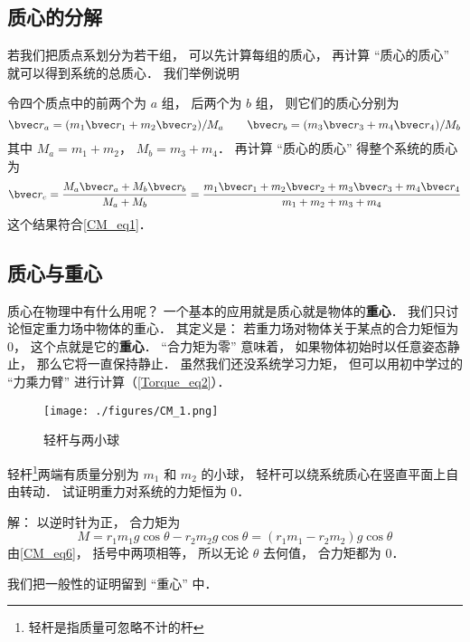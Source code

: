 \subsection{质心的分解}
若我们把质点系划分为若干组， 可以先计算每组的质心， 再计算 “质心的质心” 就可以得到系统的总质心． 我们举例说明
\begin{example}{}
令四个质点中的前两个为 $a$ 组， 后两个为 $b$ 组， 则它们的质心分别为
\begin{equation}
\bvec r_a = (m_1 \bvec r_1 + m_2 \bvec r_2)/M_a
\qquad
\bvec r_b = (m_3 \bvec r_3 + m_4 \bvec r_4)/M_b
\end{equation}
其中 $M_a = m_1 + m_2$， $M_b = m_3 + m_4$． 再计算 “质心的质心” 得整个系统的质心为
\begin{equation}
\bvec r_c = \frac{M_a \bvec r_a + M_b \bvec r_b}{M_a + M_b} = \frac{m_1 \bvec r_1 + m_2 \bvec r_2 + m_3 \bvec r_3 + m_4 \bvec r_4}{m_1 + m_2 + m_3 + m_4}
\end{equation}
这个结果符合\autoref{CM_eq1}．
\end{example}

\subsection{质心与重心}
质心在物理中有什么用呢？ 一个基本的应用就是质心就是物体的\textbf{重心}． 我们只讨论恒定重力场中物体的重心． 其定义是： 若重力场对物体关于某点的合力矩恒为 0， 这个点就是它的\textbf{重心}． “合力矩为零” 意味着， 如果物体初始时以任意姿态静止， 那么它将一直保持静止． 虽然我们还没系统学习力矩， 但可以用初中学过的 “力乘力臂” 进行计算（\autoref{Torque_eq2}）．

\begin{example}{}\label{CM_ex1}
\begin{figure}[ht]
\centering
\texttt{[image: ./figures/CM\_1.png]}
\caption{轻杆与两小球} \label{CM_fig1}
\end{figure}

轻杆\footnote{轻杆是指质量可忽略不计的杆}两端有质量分别为 $m_1$ 和 $m_2$ 的小球， 轻杆可以绕系统质心在竖直平面上自由转动． 试证明重力对系统的力矩恒为 0．

解： 以逆时针为正， 合力矩为
\begin{equation}
M = r_1 m_1 g \cos\theta - r_2 m_2 g \cos\theta = (r_1 m_1 - r_2 m_2) g \cos\theta
\end{equation}
由\autoref{CM_eq6}， 括号中两项相等， 所以无论 $\theta$ 去何值， 合力矩都为 0．
\end{example}
我们把一般性的证明留到 “重心” 中．


